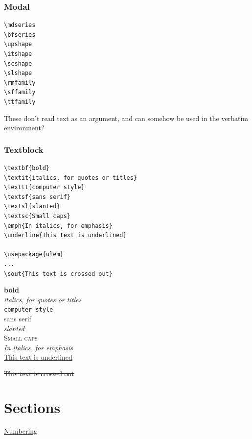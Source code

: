 \documentclass{article}
\begin{document}
\subsubsection{Modal}

\begin{minipage}[t]{0.3\textwidth}
\begin{lstlisting}
\mdseries
\bfseries
\upshape
\itshape
\scshape
\slshape
\rmfamily
\sffamily
\ttfamily
\end{lstlisting}
\end{minipage}%
\begin{minipage}[t]{0.7\textwidth}
    These don't read text as an argument, and can somehow be
    used in the verbatim environment?
\end{minipage}

\subsubsection{Textblock}
\begin{minipage}[t]{0.3\textwidth}
\begin{lstlisting}
\textbf{bold}
\textit{italics, for quotes or titles}
\texttt{computer style}
\textsf{sans serif}
\textsl{slanted}
\textsc{Small caps}
\emph{In italics, for emphasis}
\underline{This text is underlined}

\usepackage{ulem}
...
\sout{This text is crossed out}
\end{lstlisting}
\end{minipage}%
\begin{minipage}[t]{0.7\textwidth}
\textbf{bold}\\
\textit{italics, for quotes or titles}\\
\texttt{computer style}\\
\textsf{sans serif}\\
\textsl{slanted}\\
\textsc{Small caps}\\
\emph{In italics, for emphasis}\\
\underline{This text is underlined}

\sout{This text is crossed out}\\
\end{minipage}

\newpage
\section{Sections}
\begin{minipage}{\textwidth}
\href{https://www.sharelatex.com/learn/Sections_and_chapters#Numbered_and_unnumbered_sections}
    {Numbering}
\end{minipage}
\end{document}
